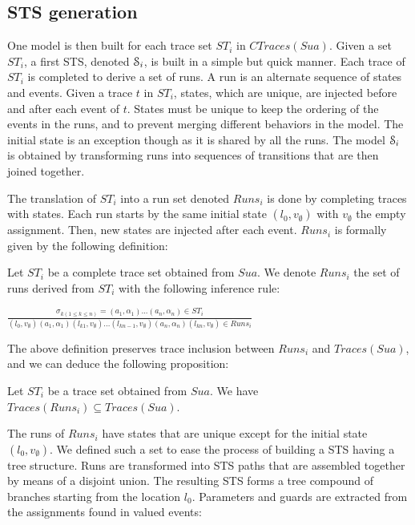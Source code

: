 \subsection{STS generation}
\label{sec:modelinf:prodsystems:generation}

One model is then built for each trace set $ST_i$ in
$CTraces(Sua)$. Given a set $ST_i$, a first STS, denoted
$\EuScript{S}_i$, is built in a simple but quick manner. Each
trace of $ST_i$ is completed to derive a set of runs. A run is an
alternate sequence of states and events. Given a trace $t$ in
$ST_i$, states, which are unique, are injected before and after
each event of $t$. States must be unique to keep the ordering of
the events in the runs, and to prevent merging different
behaviors in the model.  The initial state is an exception
though as it is shared by all the runs. The model
$\EuScript{S}_i$ is obtained by transforming runs into sequences
of transitions that are then joined together.

The translation of $ST_i$ into a run set denoted $Runs_i$ is done
by completing traces with states. Each run starts by the same
initial state $(l_0,v_\emptyset)$ with $v_\emptyset$ the empty
assignment. Then, new states are injected after each event.
$Runs_i$ is formally given by the following definition:

\begin{definition}
    Let $ST_i$ be a complete trace set obtained from $Sua$. We
denote $Runs_i$ the set of runs derived from $ST_i$ with the
following inference rule:
  \begin{center}
    $\frac{\sigma_{k(1\leq k \leq n)}=(a_1,\alpha_1)...(a_n,\alpha_n) \in ST_i}
    {(l_0,v_\emptyset) (a_1,\alpha_1) (l_{k1},v_\emptyset) \dots (l_{kn-1},v_\emptyset) (a_n,\alpha_n) (l_{kn},v_\emptyset) \in Runs_i}$
  \end{center}
\end{definition}

The above definition preserves trace inclusion between $Runs_i$
and $Traces(Sua)$, and we can deduce the following proposition:

\begin{proposition}
Let $ST_i$ be a trace set obtained from $Sua$. We have
$Traces(Runs_i) \subseteq Traces(Sua)$.
\end{proposition}

The runs of $Runs_i$ have states that are unique except for the
initial state $(l_0,v_\emptyset)$. We defined such a set to
ease the process of building a STS having a tree structure.  Runs
are transformed into STS paths that are assembled together by
means of a disjoint union. The resulting STS forms a tree
compound of branches starting from the location $l_0$. Parameters
and guards are extracted from the assignments found in valued
events:

